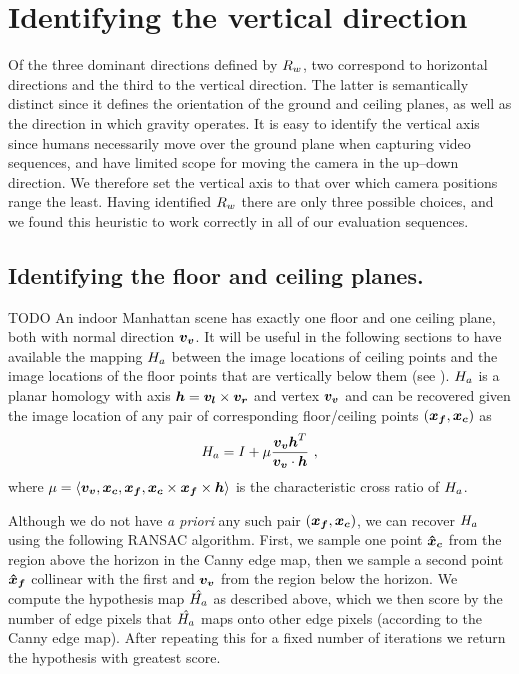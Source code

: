 \section{Identifying the vertical direction}
Of the three dominant directions defined by $\SceneR$, two correspond to
horizontal directions and the third to the vertical direction. The
latter is semantically distinct since it defines the orientation of
the ground and ceiling planes, as well as the direction in which
gravity operates. It is easy to identify the vertical axis since
humans necessarily move over the ground plane when capturing video
sequences, and have limited scope for moving the camera in the
up--down direction. We therefore set the vertical axis to that over
which camera positions range the least. Having identified $\SceneR$ there
are only three possible choices, and we found this heuristic to work
correctly in all of our evaluation sequences.


\subsection{Identifying the floor and ceiling planes.}
\label{sect:fcmap}
TODO
An indoor Manhattan scene has exactly one floor and one ceiling plane,
both with normal direction $\vvpt$. It will be useful in the following
sections to have available the mapping $\Hcf$ between the image
locations of ceiling points and the image locations of the floor
points that are vertically below them (see ). $\Hcf$ is
a planar homology with axis $\vect{h}=\lvpt\times\rvpt$ and vertex
$\vvpt$ \cite{Criminisi01} and can be recovered given the image
location of any pair of corresponding floor/ceiling points
$(\vect{x_f},\vect{x_c})$ as
\begin{equation}
  \Hcf = I + \mu\frac{\vvpt\vect{h}^T}{\vvpt \cdot \vect{h}} ~,
\end{equation}
where $\mu = \langle\vvpt,\vect{x_c},\vect{x_f},
\vect{x_c}\times\vect{x_f}\times\vect{h}\rangle$ is the characteristic cross
ratio of $\Hcf$.

Although we do not have \textit{a priori} any such pair
$(\vect{x_f},\vect{x_c})$, we can recover $\Hcf$ using the following
RANSAC algorithm. First, we sample one point $\vect{\hat{x}_c}$ from
the region above the horizon in the Canny edge map, then we sample a
second point $\vect{\hat{x}_f}$ collinear with the first and
$\vvpt$ from the region below the horizon. We compute the
hypothesis map $\Hcfhat$ as described above, which we then score by
the number of edge pixels that $\Hcfhat$ maps onto other edge pixels
(according to the Canny edge map). After repeating this for a fixed
number of iterations we return the hypothesis with greatest score.

